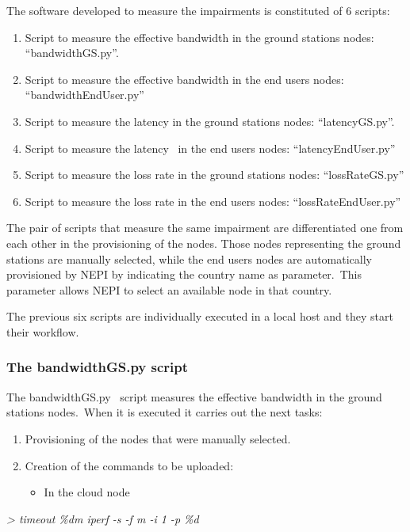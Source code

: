 \documentclass[a4paper]{article}
\newcounter{saveenum}
\newcommand\liststyleLFOvii{%
\renewcommand\theenumi{\arabic{enumi}}
\renewcommand\theenumii{\roman{enumii}}
\renewcommand\theenumiii{\arabic{enumiii}}
\renewcommand\labelenumi{\theenumi.}
\renewcommand\labelitemi{[F0D8?]}
\renewcommand\labelenumii{\theenumii.}
\renewcommand\labelenumiii{\theenumiii.}
}
\newcommand\liststyleLFOviii{%
\renewcommand\theenumi{\arabic{enumi}}
\renewcommand\theenumii{\roman{enumii}}
\renewcommand\theenumiii{\arabic{enumiii}}
\renewcommand\labelenumi{\theenumi.}
\renewcommand\labelitemi{o}
\renewcommand\labelenumii{\theenumii.}
\renewcommand\labelenumiii{\theenumiii.}
}
\begin{document}
\bigskip

The software developed to measure the impairments is constituted of 6
scripts:

\liststyleLFOvii
\setcounter{saveenum}{\value{enumi}}
\begin{enumerate}
\setcounter{enumi}{\value{saveenum}}
\item Script to measure the effective bandwidth in the ground stations
nodes: {\textquotedblleft}bandwidthGS.py{\textquotedblright}.\ 
\item Script to measure the effective bandwidth in the end users nodes:
{\textquotedblleft}bandwidthEndUser.py{\textquotedblright}
\item Script to measure the latency in the ground stations nodes:
{\textquotedblleft}latencyGS.py{\textquotedblright}.
\item Script to measure the latency \ in the end users nodes:
{\textquotedblleft}latencyEndUser.py{\textquotedblright}
\item Script to measure the loss rate in the ground stations nodes:
{\textquotedblleft}lossRateGS.py{\textquotedblright}
\item Script to measure the loss rate in the end users nodes:
{\textquotedblleft}lossRateEndUser.py{\textquotedblright}
\end{enumerate}
The pair of scripts that measure the same impairment are differentiated
one from each other in the provisioning of the nodes. Those nodes
representing the ground stations are manually selected, while the end
users nodes are automatically provisioned by NEPI by indicating the
country name as parameter.\ This parameter allows NEPI to select an
available node in that country.\ 


\bigskip

The previous six scripts are individually executed in a local host and
they start their workflow.


\bigskip

\subsubsection{The bandwidthGS.py script}
The bandwidthGS.py \ script measures the effective bandwidth in the
ground stations nodes.\ When it is executed it carries out the next
tasks:

\liststyleLFOviii
\setcounter{saveenum}{\value{enumi}}
\begin{enumerate}
\setcounter{enumi}{\value{saveenum}}
\item Provisioning of the nodes that were manually selected.
\item Creation of the commands to be uploaded:

\begin{itemize}
\item In the cloud node
\end{itemize}
\end{enumerate}
{\itshape
{\textgreater} timeout \%dm iperf -s -f m -i 1 -p \%d\ }
\end{document}
